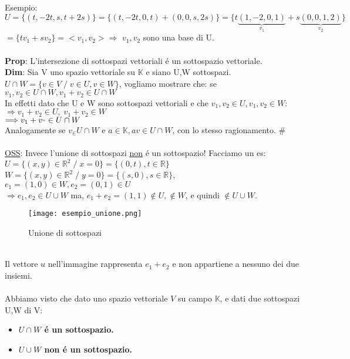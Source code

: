 \documentclass[12pt]{article}
\begin{document}
Esempio:\\
$U=\{(t,-2t,s,t+2s)\}=\{(t,-2t,0,t)+(0,0,s,2s)\}=\{t\underbrace{(1,-2,0,1)}_{v_1}+s\underbrace{(0,0,1,2)}_{v_2}\}$\\
$=\{tv_1+sv_2\}=<v_1,v_2> \Longrightarrow$ $v_1,v_2$ sono una base di U.\\\\
\textbf{Prop}: L'intersezione di sottospazi vettoriali é un sottospazio vettoriale.\\
\textbf{Dim}: Sia V uno spazio vettoriale su $\mathbb{K}$ e siano U,W sottospazi.\\
$U\cap W = \{v\in V \;/\; v \in U, v\in W\}$, vogliamo mostrare che: se $v_1,v_2 \in U\cap W, v_1+v_2 \in U\cap W$\\
In effetti dato che U e W sono sottospazi vettoriali e che $v_1,v_2 \in U, v_1,v_2\in W$:\\
$\Longrightarrow v_1+v_2 \in U,\; v_1+v_2\in W$\\
$\Longrightarrow v_1+v_" \in U\cap W$\\
Analogamente se $v_\in U\cap W$ e $a\in \mathbb{K}, av \in U\cap W$, con lo stesso ragionamento.  \# \\\\
\underline{OSS}: Invece l'unione di sottospazi \underline{non} é un sottospazio! Facciamo un es:\\
$U = \{(x,y) \in \mathbb{R}^2 \;/\; x=0\} = \{(0,t), t\in \mathbb{R}\}$\\
$W=\{(x,y) \in \mathbb{R}^2 \;/\; y=0\} = \{(s,0), s\in \mathbb{R} \}$, $e_1 = (1,0)\in W, e_2=(0,1) \in U$\\
$\Longrightarrow e_1,e_2 \in U\cup W$ ma, $e_1+e_2 = (1,1) \notin U, \notin W$, e quindi $\notin U\cup W$.
\begin{figure}[h!]
        \centering
        \texttt{[image: esempio\_unione.png]}
        \caption{Unione di sottospazi}
    \end{figure}\\
Il vettore $u$ nell'immagine rappresenta $e_1 + e_2$ e non appartiene a nessuno dei due insiemi.\\\\
Abbiamo visto che dato uno spazio vettoriale $V$ su campo $\mathbb{K}$, e dati due sottospazi U,W di V:
\begin{itemize}
    \item \textbf{$U\cap W$ é un sottospazio.}
    \item \textbf{$U\cup W$ non é un sottospazio.}
\end{itemize}
\end{document}
